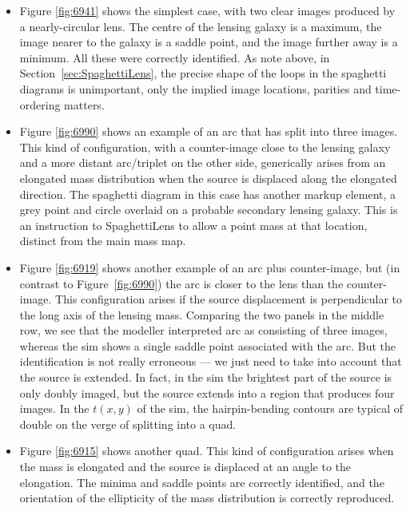 \documentclass[usenatbib]{mn2e}
\newcommand{\spl}{SpaghettiLens\xspace}
\newcommand{\figref}[1]{Figure~\ref{fig:#1}}
\newcommand{\secref}[1]{Section~\ref{sec:#1}}
\begin{document}
\begin{itemize}

\item Figure \ref{fig:6941} shows the simplest case, with two clear
  images produced by a nearly-circular lens.  The centre of the
  lensing galaxy is a maximum, the image nearer to the galaxy is a
  saddle point, and the image further away is a minimum.  All these
  were correctly identified.  As note above, in
  \secref{SpaghettiLens}, the precise shape of the loops in the
  spaghetti diagrams is unimportant, only the implied image locations,
  parities and time-ordering matters.

\item Figure \ref{fig:6990} shows an example of an arc that has split
  into three images.  This kind of configuration, with a counter-image
  close to the lensing galaxy and a more distant arc/triplet on the
  other side, generically arises from an elongated mass distribution
  when the source is displaced along the elongated direction.  The
  spaghetti diagram in this case has another markup element, a grey
  point and circle overlaid on a probable secondary lensing galaxy.
  This is an instruction to \spl to allow a point mass at that
  location, distinct from the main mass map.

\item Figure \ref{fig:6919} shows another example of an arc plus
  counter-image, but (in contrast to \figref{6990}) the arc is closer
  to the lens than the counter-image. This configuration arises if the
  source displacement is perpendicular to the long axis of the lensing
  mass.  Comparing the two panels in the middle row, we see that the
  modeller interpreted arc as consisting of three images, whereas the
  sim shows a single saddle point associated with the arc.  But the
  identification is not really erroneous --- we just need to take into
  account that the source is extended.  In fact, in the sim the
  brightest part of the source is only doubly imaged, but the source
  extends into a region that produces four images.  In the $t(x,y)$ of
  the sim, the hairpin-bending contours are typical of double on the
  verge of splitting into a quad.

\item Figure \ref{fig:6915} shows another quad.  This kind of
  configuration arises when the mass is elongated and the source is
  displaced at an angle to the elongation.  The minima and saddle
  points are correctly identified, and the orientation of the
  ellipticity of the mass distribution is correctly reproduced.


\end{itemize}
\end{document}
